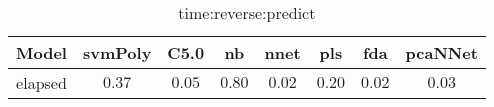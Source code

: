 \begin{table}[!ht]
	\centering
	\begin{tabular}{|c|c|c|c|c|c|c|c|}
		\hline
		Model & svmPoly & C5.0 & nb & nnet & pls & fda & pcaNNet \\ \hline
		elapsed & $0.37$ & $0.05$ & $0.80$ & $0.02$ & $0.20$ & $0.02$ & $0.03$ \\ \hline
	\end{tabular}
	\caption{time:reverse:predict}
	\label{tab:time:reverse:predict}
\end{table}
